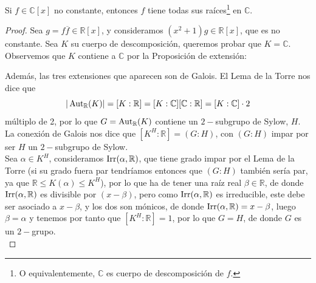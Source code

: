 \begin{teo} 
    Si $f\in \mathbb{C}[x]$ no constante, entonces $f$ tiene todas sus raíces\footnote{O equivalentemente, $\mathbb{C}$ es cuerpo de descomposición de $f$.} en $\mathbb{C}$.
    \begin{proof}
        Sea $g=f\overline{f}\in \mathbb{R}[x]$, y consideramos $(x^2+1)g\in \mathbb{R}[x]$, que es no constante. Sea $K$ su cuerpo de descomposición, queremos probar que $K = \mathbb{C}$. Observemos que $K$ contiene a $\mathbb{C}$ por la Proposición de extensión:
        \begin{figure}[H]
            \centering
        \end{figure}
        \noindent
        Además, las tres extensiones que aparecen son de Galois. El Lema de la Torre nos dice que 
        \begin{equation*}
            |\operatorname{Aut}_{\mathbb{R}}(K)| = [K:\mathbb{R}] = [K:\mathbb{C}][\mathbb{C}:\mathbb{R}] = [K:\mathbb{C}]\cdot 2
        \end{equation*}
        múltiplo de 2, por lo que $G=\operatorname{Aut}_\mathbb{R}(K)$ contiene un $2-$subgrupo de Sylow, $H$. La conexión de Galois nos dice que $[K^H:\mathbb{R}] = (G:H)$, con $(G:H)$ impar por ser $H$ un $2-$subgrupo de Sylow.\\

        \noindent
        Sea $\alpha\in K^H$, consideramos $\operatorname{Irr}(\alpha,\mathbb{R})$, que tiene grado impar por el Lema de la Torre (si su grado fuera par tendríamos entonces que $(G:H)$ también sería par, ya que $\mathbb{R}\leq K(\alpha)\leq K^H$), por lo que ha de tener una raíz real $\beta\in \mathbb{R}$, de donde $\operatorname{Irr}(\alpha,\mathbb{R})$ es divisible por $(x-\beta)$, pero como $\operatorname{Irr}(\alpha,\mathbb{R})$ es irreducible, este debe ser asociado a $x-\beta$, y los dos son mónicos, de donde $\operatorname{Irr}(\alpha,\mathbb{R}) = x-\beta$, luego $\beta = \alpha$ y tenemos por tanto que $[K^H:\mathbb{R}] = 1$, por lo que $G=H$, de donde $G$ es un $2-$grupo.\\


\end{proof}
\end{teo}
